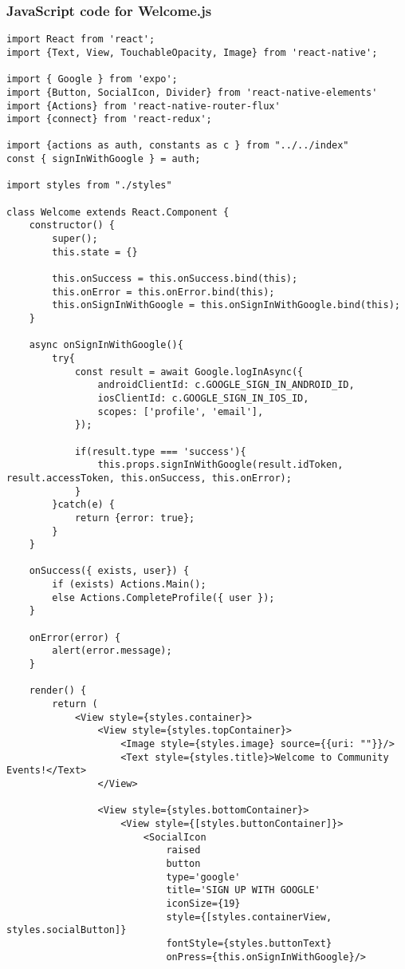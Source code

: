 \documentclass[letterpaper, 10pt,titlepage]{article}
\begin{document}
\subsubsection{JavaScript code for Welcome.js}
\begin{verbatim}
import React from 'react';
import {Text, View, TouchableOpacity, Image} from 'react-native';

import { Google } from 'expo';
import {Button, SocialIcon, Divider} from 'react-native-elements'
import {Actions} from 'react-native-router-flux'
import {connect} from 'react-redux';

import {actions as auth, constants as c } from "../../index"
const { signInWithGoogle } = auth;

import styles from "./styles"

class Welcome extends React.Component {
    constructor() {
        super();
        this.state = {}

        this.onSuccess = this.onSuccess.bind(this);
        this.onError = this.onError.bind(this);
        this.onSignInWithGoogle = this.onSignInWithGoogle.bind(this);
    }

    async onSignInWithGoogle(){
        try{
            const result = await Google.logInAsync({
                androidClientId: c.GOOGLE_SIGN_IN_ANDROID_ID,
                iosClientId: c.GOOGLE_SIGN_IN_IOS_ID,
                scopes: ['profile', 'email'],
            });

            if(result.type === 'success'){
                this.props.signInWithGoogle(result.idToken, result.accessToken, this.onSuccess, this.onError);
            }
        }catch(e) {
            return {error: true};
        }
    }

    onSuccess({ exists, user}) {
        if (exists) Actions.Main();
        else Actions.CompleteProfile({ user });
    }

    onError(error) {
        alert(error.message);
    }

    render() {
        return (
            <View style={styles.container}>
                <View style={styles.topContainer}>
                    <Image style={styles.image} source={{uri: ""}}/>
                    <Text style={styles.title}>Welcome to Community Events!</Text>
                </View>

                <View style={styles.bottomContainer}>
                    <View style={[styles.buttonContainer]}>
                        <SocialIcon
                            raised
                            button
                            type='google'
                            title='SIGN UP WITH GOOGLE'
                            iconSize={19}
                            style={[styles.containerView, styles.socialButton]}
                            fontStyle={styles.buttonText}
                            onPress={this.onSignInWithGoogle}/>


\end{verbatim}
\end{document}
